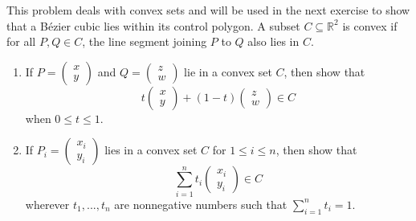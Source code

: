 \begin{exercise}{14}
This problem deals with convex sets and will be used in the next exercise to show that a B\'ezier cubic lies within its control polygon. A subset $C\subseteq \mathbb{R}^2$ is convex if for all $P,Q\in C$, the line segment joining $P$ to $Q$ also lies in $C$.
\begin{enumerate}
    \item If $P = \left(\begin{array}{c} x\\ y\end{array}\right)$ and $Q = \left(\begin{array}{c} z\\ w\end{array}\right)$ lie in a convex set $C$, then show that
    $$t\left(\begin{array}{c} x\\ y\end{array}\right) + (1-t)\left(\begin{array}{c} z\\ w\end{array}\right)\in C$$
    when $0\leq t\leq 1$.
    \item If $P_i = \left(\begin{array}{c} x_i\\ y_i\end{array}\right)$ lies in a convex set $C$ for $1\leq i \leq n$, then show that
    $$\sum_{i=1}^n t_i \left(\begin{array}{c} x_i\\ y_i\end{array}\right)\in C$$
    wherever $t_1,...,t_n$ are nonnegative numbers such that $\sum_{i=1}^n t_i = 1$. 
\end{enumerate}
\end{exercise}

